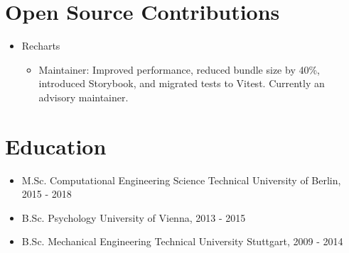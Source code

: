 \documentclass[letterpaper,11pt]{article}
\newcommand{\role}[2]{\item{#1 \hfill #2 \\}} %
\newcommand{\project}[2]{\item\small{#1: #2}} %
\newcommand{\resumeSubHeadingListStart}{\begin{itemize}[leftmargin=*]}
\newcommand{\resumeSubHeadingListEnd}{\end{itemize}}
\newcommand{\projectliststart}{\begin{itemize}[leftmargin=*] \vspace{-5pt} }
\newcommand{\projectlistend}{\end{itemize}\vspace{-5pt}}
\begin{document}
\section{Open Source Contributions}

\resumeSubHeadingListStart
\role{Recharts}{}
\projectliststart
\project{Maintainer}{Improved performance, reduced bundle size by 40\%, introduced Storybook, and migrated tests to Vitest. Currently an advisory maintainer.}
\projectlistend
\resumeSubHeadingListEnd

\section{Education}
\resumeSubHeadingListStart
\role{M.Sc. Computational Engineering Science}{Technical University of Berlin, 2015 - 2018}
\role{B.Sc. Psychology}{University of Vienna, 2013 - 2015}
\role{B.Sc. Mechanical Engineering}{Technical University Stuttgart, 2009 - 2014}
\resumeSubHeadingListEnd
\end{document}
